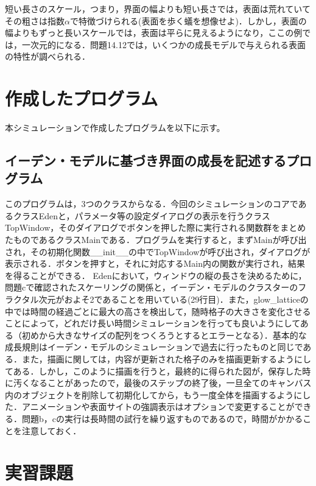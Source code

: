 \documentclass{jsarticle}
\begin{document}
    短い長さのスケール，つまり，界面の幅よりも短い長さでは，表面は荒れていてその粗さは指数$\alpha$で特徴づけられる(表面を歩く蟻を想像せよ)．しかし，表面の幅よりもずっと長いスケールでは，表面は平らに見えるようになり，ここの例では，一次元的になる．問題14.12では，いくつかの成長モデルで与えられる表面の特性が調べられる．

\section{作成したプログラム}
    本シミュレーションで作成したプログラムを以下に示す。


    \subsection{イーデン・モデルに基づき界面の成長を記述するプログラム}
    このプログラムは，3つのクラスからなる．今回のシミュレーションのコアであるクラスEdenと，パラメータ等の設定ダイアログの表示を行うクラスTopWindow，そのダイアログでボタンを押した際に実行される関数群をまとめたものであるクラスMainである．プログラムを実行すると，まずMainが呼び出され，その初期化関数\_\_init\_\_の中でTopWindowが呼び出され，ダイアログが表示される．ボタンを押すと，それに対応するMain内の関数が実行され，結果を得ることができる．
    Edenにおいて，ウィンドウの縦の長さを決めるために，問題cで確認されたスケーリングの関係と，イーデン・モデルのクラスターのフラクタル次元がおよそ2であることを用いている(29行目)．また，glow\_latticeの中では時間の経過ごとに最大の高さを検出して，随時格子の大きさを変化させることによって，どれだけ長い時間シミュレーションを行っても良いようにしてある（初めから大きなサイズの配列をつくろうとするとエラーとなる）．基本的な成長規則はイーデン・モデルのシミュレーションで過去に行ったものと同じである．また，描画に関しては，内容が更新された格子のみを描画更新するようにしてある．しかし，このように描画を行うと，最終的に得られた図が，保存した時に汚くなることがあったので，最後のステップの終了後，一旦全てのキャンバス内のオブジェクトを削除して初期化してから，もう一度全体を描画するようにした．アニメーションや表面サイトの強調表示はオプションで変更することができる．問題b，cの実行は長時間の試行を繰り返すものであるので，時間がかかることを注意しておく．
        
\section{実習課題}
\end{document}
